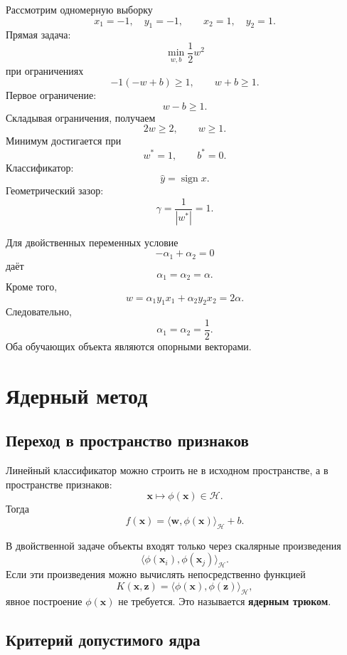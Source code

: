 \documentclass[12pt,a4paper]{article}
\theoremstyle{definition}
\newcommand{\1}{\mathbf{1}}
\DeclareMathOperator{\sign}{sign}
\begin{document}
Рассмотрим одномерную выборку
\[
    x_1=-1,\quad y_1=-1,
    \qquad
    x_2=1,\quad y_2=1.
\]
Прямая задача:
\[
    \min_{w,b}\frac{1}{2}w^2
\]
при ограничениях
\[
    -1(-w+b)\geq1,
    \qquad
    w+b\geq1.
\]
Первое ограничение:
\[
    w-b\geq1.
\]
Складывая ограничения, получаем
\[
    2w\geq2,
    \qquad
    w\geq1.
\]
Минимум достигается при
\[
    w^{*}=1,
    \qquad
    b^{*}=0.
\]
Классификатор:
\[
    \widehat{y}=\sign x.
\]
Геометрический зазор:
\[
    \gamma=\frac{1}{|w^{*}|}=1.
\]

Для двойственных переменных условие
\[
    -\alpha_1+\alpha_2=0
\]
даёт
\[
    \alpha_1=\alpha_2=\alpha.
\]
Кроме того,
\[
    w
    =
    \alpha_1y_1x_1+\alpha_2y_2x_2
    =
    2\alpha.
\]
Следовательно,
\[
    \alpha_1=\alpha_2=\frac{1}{2}.
\]
Оба обучающих объекта являются опорными векторами.

\section{Ядерный метод}

\subsection{Переход в пространство признаков}

Линейный классификатор можно строить не в исходном пространстве, а в
пространстве признаков:
\[
    \bm{x}\mapsto\phi(\bm{x})\in\mathcal{H}.
\]
Тогда
\[
    f(\bm{x})
    =
    \langle\bm{w},\phi(\bm{x})\rangle_{\mathcal{H}}+b.
\]

В двойственной задаче объекты входят только через скалярные
произведения
\[
    \langle\phi(\bm{x}_i),\phi(\bm{x}_j)\rangle_{\mathcal{H}}.
\]
Если эти произведения можно вычислять непосредственно функцией
\[
    K(\bm{x},\bm{z})
    =
    \langle\phi(\bm{x}),\phi(\bm{z})\rangle_{\mathcal{H}},
\]
явное построение $\phi(\bm{x})$ не требуется. Это называется
\textbf{ядерным трюком}.

\subsection{Критерий допустимого ядра}
\end{document}
